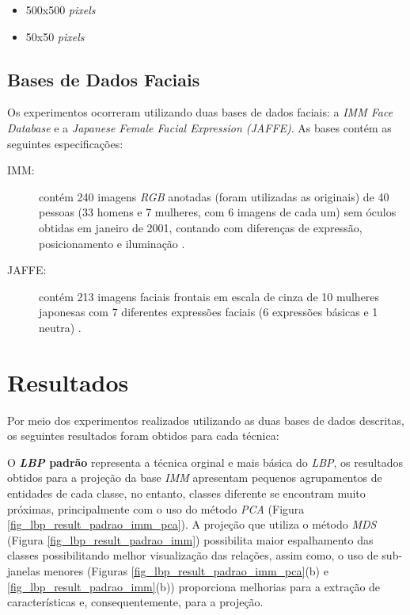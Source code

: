\documentclass[conference]{IEEEtran}
\begin{document}
\begin{itemize}

\item 500x500 \textit{pixels}

\item 50x50 \textit{pixels}

\end{itemize} 

\subsection{Bases de Dados Faciais}

Os experimentos ocorreram utilizando duas bases de dados faciais: a \textit{IMM Face Database} e a \textit{Japanese Female Facial Expression (JAFFE)}. As bases contém as seguintes especificações:

\begin{description}

\item[IMM:] contém 240 imagens \textit{RGB} anotadas (foram utilizadas as originais) de 40 pessoas (33 homens e 7 mulheres, com 6 imagens de cada um) sem óculos obtidas em janeiro de 2001, contando com diferenças de expressão, posicionamento e iluminação \cite{imm,imm2}.

\item[JAFFE: ] contém 213 imagens faciais frontais em escala de cinza de 10 mulheres japonesas com 7 diferentes expressões faciais (6 expressões básicas e 1 neutra) \cite{jaffe}. 

\end{description}

\section{Resultados}
\label{sec_resultados}

Por meio dos experimentos realizados utilizando as duas bases de dados descritas, os seguintes resultados foram obtidos para cada técnica:


O \textbf{\textit{LBP} padrão} representa a técnica orginal e mais básica do \textit{LBP}, os resultados obtidos para a projeção da base \textit{IMM} apresentam pequenos agrupamentos de entidades de cada classe, no entanto, classes diferente se encontram muito próximas, principalmente com o uso do método \textit{PCA} (Figura \ref{fig_lbp_result_padrao_imm_pca}). A projeção que utiliza o método \textit{MDS} (Figura \ref{fig_lbp_result_padrao_imm}) possibilita maior espalhamento das classes possibilitando melhor visualização das relações, assim como, o uso de sub-janelas menores (Figuras \ref{fig_lbp_result_padrao_imm_pca}(b) e \ref{fig_lbp_result_padrao_imm}(b)) proporciona melhorias para a extração de características e, consequentemente, para a projeção.
\end{document}
